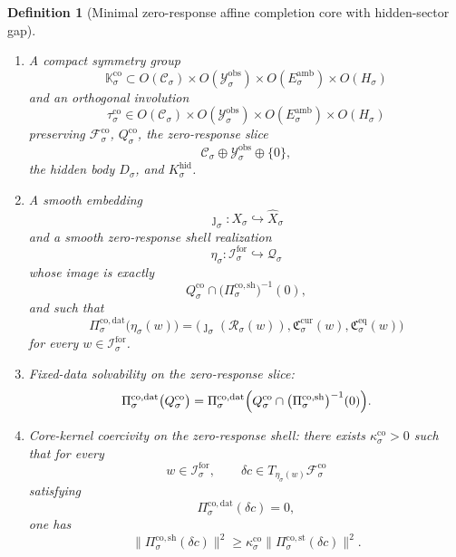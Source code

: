 \documentclass[11pt]{article}
\newcommand{\ForSpace}[1]{\mathcal I_{#1}^{\mathrm{for}}}
\newcommand{\Reduction}[1]{\mathcal R_{#1}}
\newcommand{\CurrentCarrier}[1]{\mathfrak C_{#1}^{\mathrm{cur}}}
\newcommand{\EqCarrier}[1]{\mathfrak C_{#1}^{\mathrm{eq}}}
\newcommand{\VisibleAffine}[1]{\widehat X_{#1}}
\newcommand{\DataSpace}[1]{\mathcal Y_{#1}^{\mathrm{obs}}}
\newcommand{\AmbientTarget}[1]{E_{#1}^{\mathrm{amb}}}
\newcommand{\CoreState}[1]{\mathcal C_{#1}}
\newcommand{\CoreSpace}[1]{\mathcal Q_{#1}}
\newcommand{\CoreAffine}[1]{\mathcal F_{#1}^{\mathrm{co}}}
\newcommand{\CoreBody}[1]{Q_{#1}^{\mathrm{co}}}
\newcommand{\CoreStateProj}[1]{\Pi_{#1}^{\mathrm{co,st}}}
\newcommand{\CoreDataProj}[1]{\Pi_{#1}^{\mathrm{co,dat}}}
\newcommand{\CoreShellProj}[1]{\Pi_{#1}^{\mathrm{co,sh}}}
\newcommand{\CoreSym}[1]{\mathbb K_{#1}^{\mathrm{co}}}
\newcommand{\CoreTime}[1]{\tau_{#1}^{\mathrm{co}}}
\newcommand{\CoreEmbed}[1]{\eta_{#1}}
\newcommand{\GapSpace}[1]{H_{#1}}
\newcommand{\GapBody}[1]{D_{#1}}
\newcommand{\HiddenOperator}[1]{K_{#1}^{\mathrm{hid}}}
\newtheorem{definition}{Definition}
\begin{document}
\begin{definition}[Minimal zero-response affine completion core with hidden-sector gap]
\begin{enumerate}
\begin{equation}
    \label{eq:coregap}
    \end{equation}
    for some \(\kappa_{\sigma}^{\mathrm{hid}}>0\).
    \item A compact symmetry group
    \[
    \CoreSym{\sigma}\subset
    O(\CoreState{\sigma})\times
    O(\DataSpace{\sigma})\times
    O(\AmbientTarget{\sigma})\times
    O(\GapSpace{\sigma})
    \]
    and an orthogonal involution
    \[
    \CoreTime{\sigma}\in
    O(\CoreState{\sigma})\times
    O(\DataSpace{\sigma})\times
    O(\AmbientTarget{\sigma})\times
    O(\GapSpace{\sigma})
    \]
    preserving \(\CoreAffine{\sigma}\), \(\CoreBody{\sigma}\), the zero-response slice
    \[
    \CoreState{\sigma}\oplus\DataSpace{\sigma}\oplus\{0\},
    \]
    the hidden body \(\GapBody{\sigma}\), and \(\HiddenOperator{\sigma}\).
    \item A smooth embedding
    \[
    \jmath_{\sigma}:X_{\sigma}\hookrightarrow \VisibleAffine{\sigma}
    \]
    and a smooth zero-response shell realization
    \[
    \CoreEmbed{\sigma}:\ForSpace{\sigma}\hookrightarrow\CoreSpace{\sigma}
    \]
    whose image is exactly
    \[
    \CoreBody{\sigma}\cap
    \bigl(\CoreShellProj{\sigma}\bigr)^{-1}(0),
    \]
    and such that
    \begin{equation}
    \CoreDataProj{\sigma}\bigl(\CoreEmbed{\sigma}(w)\bigr)
    =
    \bigl(
    \jmath_{\sigma}(\Reduction{\sigma}(w)),
    \CurrentCarrier{\sigma}(w),
    \EqCarrier{\sigma}(w)
    \bigr)
    \label{eq:corecompat}
    \end{equation}
    for every \(w\in\ForSpace{\sigma}\).
    \item Fixed-data solvability on the zero-response slice:
    \begin{equation}
    \CoreDataProj{\sigma}\bigl(\CoreBody{\sigma}\bigr)
    =
    \CoreDataProj{\sigma}
    \Bigl(
    \CoreBody{\sigma}\cap
    \bigl(\CoreShellProj{\sigma}\bigr)^{-1}(0)
    \Bigr).
    \label{eq:coresolvability}
    \end{equation}
    \item Core-kernel coercivity on the zero-response shell: there exists \(\kappa_{\sigma}^{\mathrm{co}}>0\) such that for every
    \[
    w\in\ForSpace{\sigma},
    \qquad
    \delta c\in T_{\CoreEmbed{\sigma}(w)}\CoreAffine{\sigma}
    \]
    satisfying
    \[
    \CoreDataProj{\sigma}(\delta c)=0,
    \]
    one has
    \begin{equation}
    \bigl\|
    \CoreShellProj{\sigma}(\delta c)
    \bigr\|^{2}
    \ge
    \kappa_{\sigma}^{\mathrm{co}}
    \bigl\|
    \CoreStateProj{\sigma}(\delta c)
    \bigr\|^{2}.
    \label{eq:corecoercive}
    \end{equation}
\end{enumerate}
\end{definition}
\end{document}
